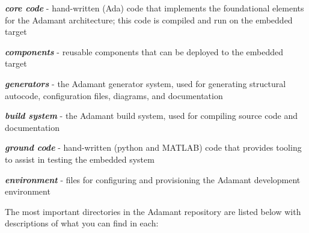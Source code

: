 \vspace{5mm} %
\begin{spaceditemize}
  \item \textbf{\textit{core code}} - hand-written (Ada) code that implements the foundational elements for the Adamant architecture; this code is compiled and run on the embedded target
  \item \textbf{\textit{components}} - reusable components that can be deployed to the embedded target
  \item \textbf{\textit{generators}} - the Adamant generator system, used for generating structural autocode, configuration files, diagrams, and documentation 
  \item \textbf{\textit{build system}} - the Adamant build system, used for compiling source code and documentation
  \item \textbf{\textit{ground code}} - hand-written (python and MATLAB) code that provides tooling to assist in testing the embedded system
  \item \textbf{\textit{environment}} - files for configuring and provisioning the Adamant development environment
\end{spaceditemize}
\vspace{5mm} %

The most important directories in the Adamant repository are listed below with descriptions of what you can find in each:

